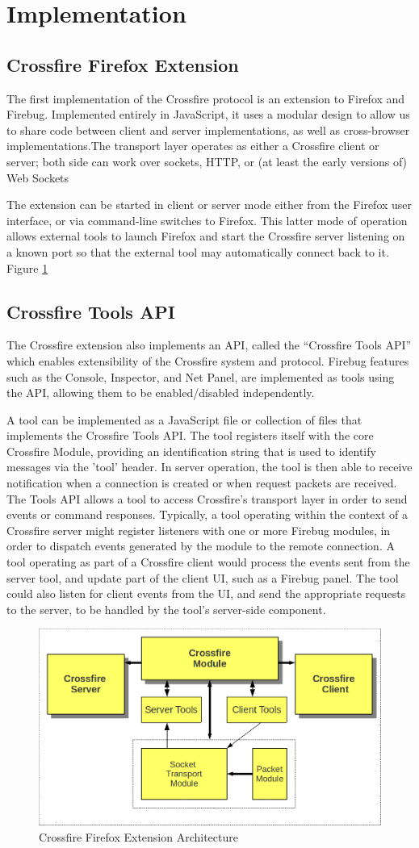 \section{Implementation}

\subsection{Crossfire Firefox Extension}
The first implementation of the Crossfire protocol is an extension to Firefox and Firebug.
Implemented entirely in JavaScript, it uses a modular design to allow us to share
code between client and server implementations, as well as cross-browser
implementations.The transport layer operates as either a Crossfire client or server; 
both side can work over sockets,  HTTP, or (at least the early versions of) Web Sockets 

The extension can be started in client or server mode either from the Firefox
user interface, or via command-line switches to Firefox. This latter mode of
operation allows external tools to launch Firefox and start the Crossfire server
listening on a known port so that the external tool may automatically connect
back to it. Figure \ref{fig:crossfire-arch}


\subsection{Crossfire Tools API}
The Crossfire extension also implements an API, called the ``Crossfire Tools
API'' which enables extensibility of the Crossfire system and protocol. Firebug
features such as the Console, Inspector, and Net Panel, are implemented as tools
using the API, allowing them to be enabled/disabled independently.

A tool can be implemented as a JavaScript file or collection of files that
implements the Crossfire Tools API. The tool registers itself with the core
Crossfire Module, providing an identification string that is used to identify
messages via the 'tool' header. In server operation, the tool is then able to
receive notification when a connection is created or when request packets are
received. The Tools API allows a tool to access Crossfire's transport layer in
order to send events or command responses.  Typically, a tool operating within
the context of a Crossfire server might register listeners with one or more
Firebug modules, in order to dispatch events generated by the module to the
remote connection. A tool operating as part of a Crossfire client would process
the events sent from the server tool, and update part of the client UI, such as
a Firebug panel. The tool could also listen for client events from the UI, and
send the appropriate requests to the server, to be handled by the tool's
server-side component.

\begin{figure}[htp]
  \includegraphics  [width = 86 mm] {figures/crossfire-arch4.png}
  \caption{Crossfire Firefox Extension Architecture}
 \label{fig:crossfire-arch}
\end{figure}
